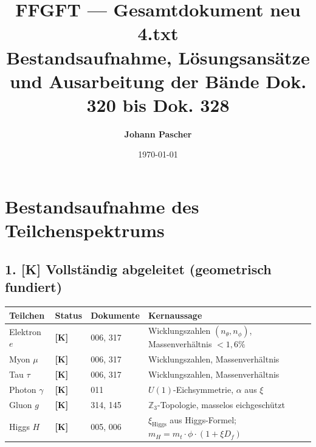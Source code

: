 \documentclass[11pt,a4paper]{article}
\title{\textbf{FFGFT — Gesamtdokument neu 4.txt}\\
	\large Bestandsaufnahme, Lösungsansätze und Ausarbeitung der Bände Dok. 320 bis Dok. 328}
\author{\textbf{Johann Pascher}}
\date{\today}
\begin{document}
	
	\maketitle
	
	\tableofcontents
	\newpage
	
	\section{Bestandsaufnahme des Teilchenspektrums}
	
	\subsection{1. [K] Vollständig abgeleitet (geometrisch fundiert)}
	\begin{longtable}{p{2.5cm}p{1.5cm}p{2cm}p{9.5cm}}
		\toprule
		\textbf{Teilchen} & \textbf{Status} & \textbf{Dokumente} & \textbf{Kernaussage} \\
		\midrule
		\endhead
		\bottomrule
		\endfoot
		Elektron $e$ & \textbf{[K]} & 006, 317 & Wicklungszahlen $(n_\theta, n_\phi)$, Massenverhältnis $<1{,}6\%$ \\
		Myon $\mu$ & \textbf{[K]} & 006, 317 & Wicklungszahlen, Massenverhältnis \\
		Tau $\tau$ & \textbf{[K]} & 006, 317 & Wicklungszahlen, Massenverhältnis \\
		Photon $\gamma$ & \textbf{[K]} & 011 & $U(1)$-Eichsymmetrie, $\alpha$ aus $\xi$ \\
		Gluon $g$ & \textbf{[K]} & 314, 145 & $\mathbb{Z}_3$-Topologie, masselos eichgeschützt \\
		Higgs $H$ & \textbf{[K]} & 005, 006 & $\xi_{\text{Higgs}}$ aus Higgs-Formel; $m_H = m_t \cdot \phi \cdot (1 + \xi D_f)$ \\
	\end{longtable}
	
\end{document}
